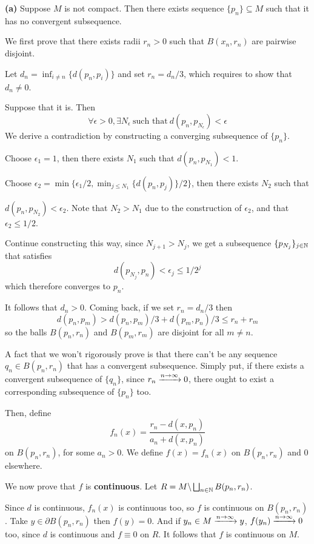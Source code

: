 \documentclass[a4paper, 12pt]{article}
\begin{document}
\begin{solution}
    \textbf{(a)} Suppose $M$ is not compact. Then there exists sequence $\{p_n\} \subseteq M$ such that it has no convergent subsequence.

    We first prove that there exists radii $r_n > 0$ such that $B(x_n, r_n)$ are pairwise disjoint.

    Let $d_n = \inf_{i \neq n}\{d(p_n, p_i)\}$ and set $r_n = d_n/3$, which requires to show that $d_n \neq 0$.

    Suppose that it is. Then \[
        \forall \epsilon > 0, \exists N_\epsilon \:\text{such that}\: d(p_n, p_{N_\epsilon}) < \epsilon
    \]
    We derive a contradiction by constructing a converging subsequence of $\{p_n\}$.

    Choose $\epsilon_1 = 1$, then there exists $N_1$ such that $d(p_n, p_{N_1}) < 1$.

    Choose $\epsilon_2 = \min\{\epsilon_1 /2, \min_{j \leq N_1}\{d(p_n, p_j)\}/2\}$, then there exists $N_2$ such that

    $d(p_n, p_{N_2}) < \epsilon_2$. Note that $N_2 > N_1$ due to the construction of $\epsilon_2$, and that $\epsilon_2 \leq 1/2$.

    Continue constructing this way, since $N_{j+1} > N_{j}$, we get a subsequence $\{p_{N_j}\}_{j \in \mathbb{N}}$ that satisfies \[
        d(p_{N_j}, p_n) < \epsilon_j \leq 1/2^j
    \]
    which therefore converges to $p_n$. \contra

    It follows that $d_n > 0$. Coming back, if we set $r_n = d_n/3$ then \[
        d(p_n, p_m) > d(p_n, p_m)/3 + d(p_m, p_n)/3 \leq r_n + r_m
    \]
    so the balls $B(p_n, r_n)$ and $B(p_m, r_m)$ are disjoint for all $m \neq n$.

    A fact that we won't rigorously prove is that there can't be any sequence $q_n \in B(p_n, r_n)$ that has a convergent subsequence. Simply put, if there exists a convergent subsequence of $\{q_n\}$, since $r_n \xrightarrow{n \to \infty} 0$, there ought to exist a corresponding subsequence of $\{p_n\}$ too.

    Then, define \[
        f_n(x) = \frac{r_n - d(x, p_n)}{a_n + d(x, p_n)}
    \]
    on $B(p_n, r_n)$, for some $a_n > 0$. We define $f(x) = f_n(x)$ on $B(p_n, r_n)$ and 0 elsewhere.

    We now prove that $f$ is \textbf{continuous}. Let $R = M \backslash \bigsqcup_{n \in \mathbb{N}} B(p_n, r_n)$.

    Since $d$ is continuous, $f_n(x)$ is continuous too, so $f$ is continuous on $B(p_n, r_n)$. Take $y \in \partial B(p_n, r_n)$ then $f(y) = 0$. And if $y_n \in M \xrightarrow{n \to \infty} y$, $f(y_n) \xrightarrow{n \to \infty} 0$ too, since $d$ is continuous and $f \equiv 0$ on $R$. It follows that $f$ is continuous on $M$.


\end{solution}
\end{document}
